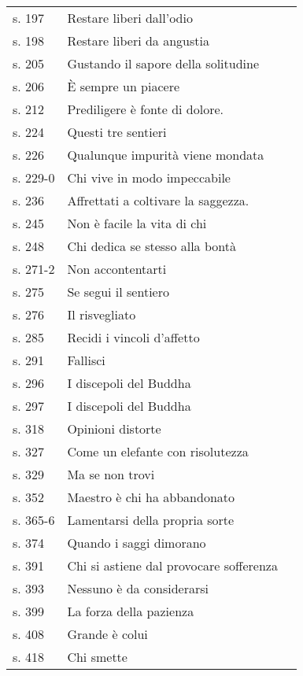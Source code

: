 {\begin{longtable}[c]{llr}
s. 197 & Restare liberi dall'odio & \pageref{dhp-197}\\
s. 198 & Restare liberi da angustia & \pageref{dhp-198}\\
s. 205 & Gustando il sapore della solitudine & \pageref{dhp-205}\\
s. 206 & È sempre un piacere & \pageref{dhp-206}\\
s. 212 & Prediligere è fonte di dolore. & \pageref{dhp-212}\\
s. 224 & Questi tre sentieri & \pageref{dhp-224}\\
s. 226 & Qualunque impurità viene mondata & \pageref{dhp-226}\\
s. 229-0 & Chi vive in modo impeccabile & \pageref{dhp-229}\\
s. 236 & Affrettati a coltivare la saggezza. & \pageref{dhp-236}\\
s. 245 & Non è facile la vita di chi & \pageref{dhp-245}\\
s. 248 & Chi dedica se stesso alla bontà & \pageref{dhp-248}\\
s. 271-2 & Non accontentarti & \pageref{dhp-271}\\
s. 275 & Se segui il sentiero & \pageref{dhp-275}\\
s. 276 & Il risvegliato & \pageref{dhp-276}\\
s. 285 & Recidi i vincoli d'affetto & \pageref{dhp-285}\\
s. 291 & Fallisci & \pageref{dhp-291}\\
s. 296 & I discepoli del Buddha & \pageref{dhp-296}\\
s. 297 & I discepoli del Buddha & \pageref{dhp-297}\\
s. 318 & Opinioni distorte & \pageref{dhp-318}\\
s. 327 & Come un elefante con risolutezza & \pageref{dhp-327}\\
s. 329 & Ma se non trovi & \pageref{dhp-329}\\
s. 352 & Maestro è chi ha abbandonato & \pageref{dhp-352}\\
s. 365-6 & Lamentarsi della propria sorte & \pageref{dhp-365}\\
s. 374 & Quando i saggi dimorano & \pageref{dhp-374}\\
s. 391 & Chi si astiene dal provocare sofferenza & \pageref{dhp-391}\\
s. 393 & Nessuno è da considerarsi & \pageref{dhp-393}\\
s. 399 & La forza della pazienza & \pageref{dhp-399}\\
s. 408 & Grande è colui & \pageref{dhp-408}\\
s. 418 & Chi smette & \pageref{dhp-418}\\
\end{longtable}

}

